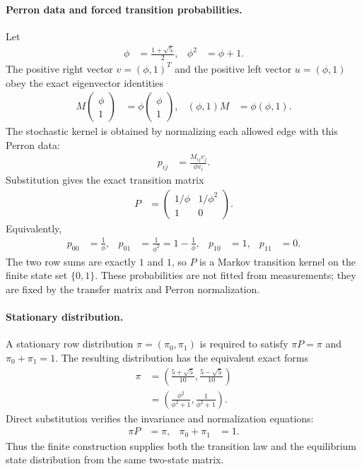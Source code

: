 \paragraph{Perron data and forced transition probabilities.}
Let
$$
\begin{aligned}
\phi&=\frac{1+\sqrt{5}}{2}, & \phi^2&=\phi+1.
\end{aligned}
$$
The positive right vector $v=(\phi,1)^T$ and the positive left vector $u=(\phi,1)$ obey the exact eigenvector identities
$$
\begin{aligned}
M\begin{pmatrix}\phi\\1\end{pmatrix}
&=\phi\begin{pmatrix}\phi\\1\end{pmatrix},
&
(\phi,1)M&=\phi(\phi,1).
\end{aligned}
$$
The stochastic kernel is obtained by normalizing each allowed edge with this Perron data:
$$
\begin{aligned}
p_{ij}&=\frac{M_{ij}v_j}{\phi v_i}.
\end{aligned}
$$
Substitution gives the exact transition matrix
$$
\begin{aligned}
P&=\begin{pmatrix}1/\phi&1/\phi^2\\1&0\end{pmatrix}.
\end{aligned}
$$
Equivalently,
$$
\begin{aligned}
p_{00}&=\frac{1}{\phi}, & p_{01}&=\frac{1}{\phi^2}=1-\frac{1}{\phi}, & p_{10}&=1, & p_{11}&=0.
\end{aligned}
$$
The two row sums are exactly $1$ and $1$, so $P$ is a Markov transition kernel on the finite state set $\{0,1\}$.  These probabilities are not fitted from measurements; they are fixed by the transfer matrix and Perron normalization.

\paragraph{Stationary distribution.}
A stationary row distribution $\pi=(\pi_0,\pi_1)$ is required to satisfy $\pi P=\pi$ and $\pi_0+\pi_1=1$.  The resulting distribution has the equivalent exact forms
$$
\begin{aligned}
\pi
&=\left(\frac{5+\sqrt{5}}{10},\frac{5-\sqrt{5}}{10}\right) \\
&=\left(\frac{\phi^2}{\phi^2+1},\frac{1}{\phi^2+1}\right).
\end{aligned}
$$
Direct substitution verifies the invariance and normalization equations:
$$
\begin{aligned}
\pi P&=\pi, & \pi_0+\pi_1&=1.
\end{aligned}
$$
Thus the finite construction supplies both the transition law and the equilibrium state distribution from the same two-state matrix.

